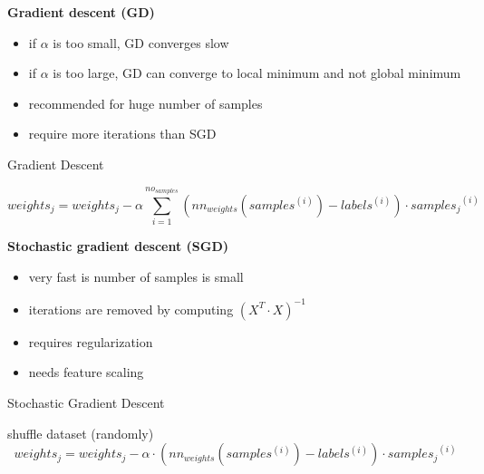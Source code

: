 \newpage
\textbf{Gradient descent (GD)}

\begin{itemize}
	\item{if $\alpha$ is too small, GD converges slow}
	\item{if $\alpha$ is too large, GD can converge to local minimum and not global minimum}
	\item{recommended for huge number of samples}
	\item{require more iterations than SGD}
\end{itemize}

\begin{algorithm}
	\caption{Gradient Descent} \label{gd-code}
	\begin{algorithmic}[1]
		\Repeat
       				\begin{equation}
					weights_j = weights_j - \alpha\displaystyle\sum_{i=1}^{no_{samples}}(nn_{weights}(samples^{(i)}) - labels^{(i)})\cdot {samples_j}^{(i)}
					\end{equation}
      			\EndFor
	\end{algorithmic}
\end{algorithm}


\vspace{8mm}


\textbf{Stochastic gradient descent (SGD)}

\begin{itemize}
	\item{very fast is number of samples is small}
	\item{iterations are removed by computing $(X^T\cdot X)^{-1}$}
	\item{requires regularization}
	\item{needs feature scaling}
\end{itemize}

\begin{algorithm}
	\caption{Stochastic Gradient Descent} \label{sgd-code}
	\begin{algorithmic}[1]
		\Repeat
			\State shuffle dataset (randomly)
       				\begin{equation}
					weights_j = weights_j - \alpha\cdot(nn_{weights}(samples^{(i)}) - labels^{(i)})\cdot {samples_j}^{(i)}
					\end{equation}
      			\EndFor
      		\EndFor
	\end{algorithmic}
\end{algorithm}

